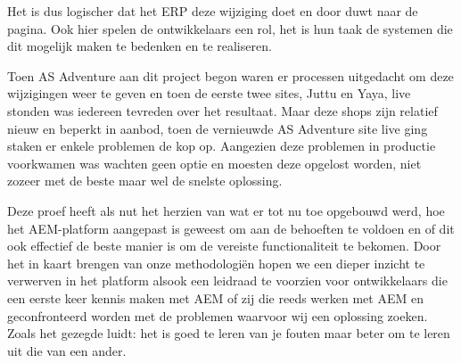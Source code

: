 \documentclass{article}
\begin{document}
	Het is dus logischer dat het ERP deze wijziging doet en door duwt naar de pagina. Ook hier spelen de ontwikkelaars een rol, het is hun taak de systemen die dit mogelijk maken te bedenken en te realiseren.
	\par
	Toen AS Adventure aan dit project begon waren er processen uitgedacht om deze wijzigingen weer te geven en toen de eerste twee sites, Juttu en Yaya, live stonden was iedereen tevreden over het resultaat. 
	Maar deze shops zijn relatief nieuw en beperkt in aanbod, toen de vernieuwde AS Adventure site live ging staken er enkele problemen de kop op. Aangezien deze problemen in productie voorkwamen was wachten geen optie en moesten deze opgelost worden, niet zozeer met de beste maar wel de snelste oplossing.
	\par
	Deze proef heeft als nut het herzien van wat er tot nu toe opgebouwd werd, hoe het AEM-platform aangepast is geweest om aan de behoeften te voldoen en of dit ook effectief de beste manier is om de vereiste functionaliteit te bekomen. 
    Door het in kaart brengen van onze methodologi\"en hopen we een dieper inzicht te verwerven in het platform alsook een leidraad te voorzien voor ontwikkelaars die een eerste keer kennis maken met AEM of zij die reeds werken met AEM en geconfronteerd worden met de problemen waarvoor wij een oplossing zoeken. 
	Zoals het gezegde luidt: het is goed te leren van je fouten maar beter om te leren uit die van een ander.
\end{document}
